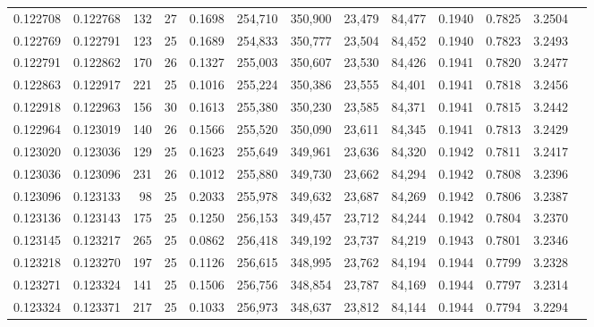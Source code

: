 \begin{tabular}{rrrrrrrrrrrrr}
0.122708 & 0.122768 & 132 &  27 &                                     0.1698 & 254,710 & 350,900 &  23,479 &  84,477 & 0.1940 & 0.7825 & 3.2504 \\
0.122769 & 0.122791 & 123 &  25 &                                     0.1689 & 254,833 & 350,777 &  23,504 &  84,452 & 0.1940 & 0.7823 & 3.2493 \\
0.122791 & 0.122862 & 170 &  26 &                                     0.1327 & 255,003 & 350,607 &  23,530 &  84,426 & 0.1941 & 0.7820 & 3.2477 \\
0.122863 & 0.122917 & 221 &  25 &                                     0.1016 & 255,224 & 350,386 &  23,555 &  84,401 & 0.1941 & 0.7818 & 3.2456 \\
0.122918 & 0.122963 & 156 &  30 &                                     0.1613 & 255,380 & 350,230 &  23,585 &  84,371 & 0.1941 & 0.7815 & 3.2442 \\
0.122964 & 0.123019 & 140 &  26 &                                     0.1566 & 255,520 & 350,090 &  23,611 &  84,345 & 0.1941 & 0.7813 & 3.2429 \\
0.123020 & 0.123036 & 129 &  25 &                                     0.1623 & 255,649 & 349,961 &  23,636 &  84,320 & 0.1942 & 0.7811 & 3.2417 \\
0.123036 & 0.123096 & 231 &  26 &                                     0.1012 & 255,880 & 349,730 &  23,662 &  84,294 & 0.1942 & 0.7808 & 3.2396 \\
0.123096 & 0.123133 &  98 &  25 &                                     0.2033 & 255,978 & 349,632 &  23,687 &  84,269 & 0.1942 & 0.7806 & 3.2387 \\
0.123136 & 0.123143 & 175 &  25 &                                     0.1250 & 256,153 & 349,457 &  23,712 &  84,244 & 0.1942 & 0.7804 & 3.2370 \\
0.123145 & 0.123217 & 265 &  25 &                                     0.0862 & 256,418 & 349,192 &  23,737 &  84,219 & 0.1943 & 0.7801 & 3.2346 \\
0.123218 & 0.123270 & 197 &  25 &                                     0.1126 & 256,615 & 348,995 &  23,762 &  84,194 & 0.1944 & 0.7799 & 3.2328 \\
0.123271 & 0.123324 & 141 &  25 &                                     0.1506 & 256,756 & 348,854 &  23,787 &  84,169 & 0.1944 & 0.7797 & 3.2314 \\
0.123324 & 0.123371 & 217 &  25 &                                     0.1033 & 256,973 & 348,637 &  23,812 &  84,144 & 0.1944 & 0.7794 & 3.2294 \\

\end{tabular}

